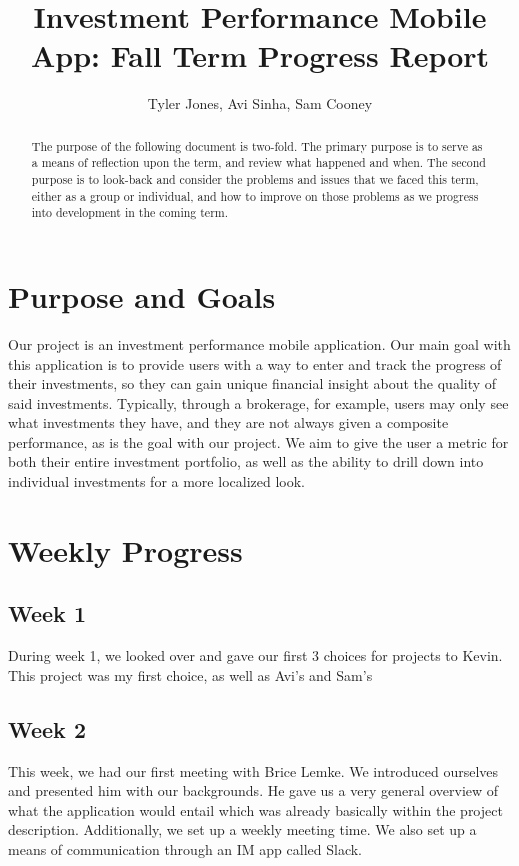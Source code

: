 \documentclass[letterpaper,10pt,titlepage,journal,compsoc,draftclsnofoot,onecolumn]{IEEEtran}
\title{Investment Performance Mobile App: Fall Term Progress Report}
\author{Tyler Jones, Avi Sinha, Sam Cooney}
\newcommand\tab[1][1cm]{\hspace*{#1}}
\begin{document}
\begin{titlingpage}
    \maketitle
	\centering{}
    \begin{abstract}
        
     The purpose of the following document is two-fold. The primary purpose is to serve as a means of reflection upon the term, and review what happened and when. The second purpose is to look-back and consider the problems and issues that we faced this term, either as a group or individual, and how to improve on those problems as we progress into development in the coming term.
        
    \end{abstract}
\end{titlingpage}

\newpage

\tableofcontents{}

\newpage

\section{Purpose and Goals}

\tab Our project is an investment performance mobile application. Our main goal with this application is to provide users with a way to enter and track the progress of their investments, so they can gain unique financial insight about the quality of said investments. Typically, through a brokerage, for example, users may only see what investments they have, and they are not always given a composite performance, as is the goal with our project. We aim to give the user a metric for both their entire investment portfolio, as well as the ability to drill down into individual investments for a more localized look.

\section{Weekly Progress}

    \subsection{Week 1}
    During week 1, we looked over and gave our first 3 choices for projects to Kevin. This project was my first choice, as well as Avi's and Sam's
    \subsection{Week 2}
    This week, we had our first meeting with Brice Lemke. We introduced ourselves and presented him with our backgrounds. He gave us a very general overview of what the application would entail which was already basically within the project description. Additionally, we set up a weekly meeting time. We also set up a means of communication through an IM app called Slack.
    
\end{document}
